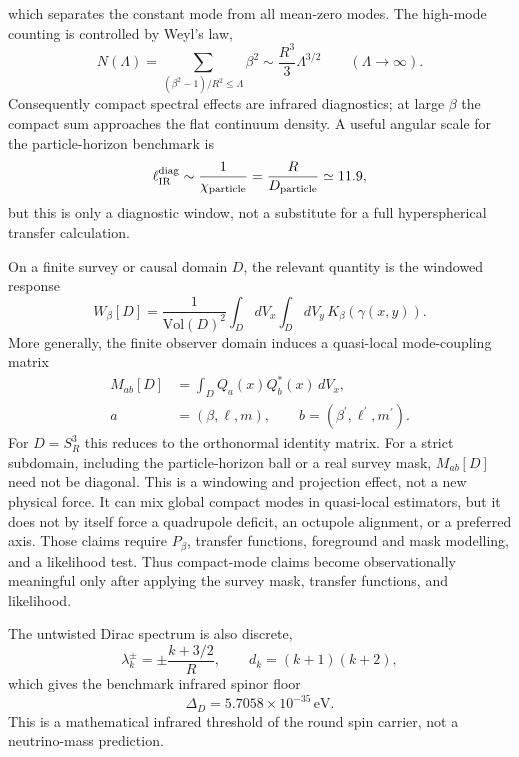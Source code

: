 \documentclass[aps,prd,onecolumn,superscriptaddress,longbibliography,nofootinbib,notitlepage]{revtex4-2}
\begin{document}
which separates the constant mode from all mean-zero modes. The high-mode counting is
controlled by Weyl's law,
\begin{equation}
  N(\Lambda)=\sum_{(\beta^2-1)/R^2\leq\Lambda}\beta^2
  \sim \frac{R^3}{3}\Lambda^{3/2}\qquad(\Lambda\to\infty).
\end{equation}
Consequently compact spectral effects are infrared diagnostics; at large $\beta$ the
compact sum approaches the flat continuum density. A useful angular scale for the
particle-horizon benchmark is
\begin{equation}
  \ell_{\rm IR}^{\rm diag}\sim\frac{1}{\chi_{\rm particle}}
  =\frac{R}{D_{\rm particle}}\simeq 11.9,
\end{equation}
but this is only a diagnostic window, not a substitute for a full hyperspherical
transfer calculation.

On a finite survey or causal domain $D$, the relevant quantity is the windowed response
\begin{equation}
  W_\beta[D]
  =\frac{1}{\mathrm{Vol}(D)^2}
  \int_DdV_x\int_DdV_y\,K_\beta(\gamma(x,y)).
\end{equation}
More generally, the finite observer domain induces a quasi-local mode-coupling matrix
\begin{equation}
\begin{aligned}
  M_{ab}[D]&=\int_D Q_a(x)Q_b^*(x)\,dV_x,\\
  a&=(\beta,\ell,m),\qquad b=(\beta^\prime,\ell^\prime,m^\prime).
\end{aligned}
\end{equation}
For $D=S^3_R$ this reduces to the orthonormal identity matrix. For a strict subdomain,
including the particle-horizon ball or a real survey mask, $M_{ab}[D]$ need not be
diagonal. This is a windowing and projection effect, not a new physical force. It can
mix global compact modes in quasi-local estimators, but it does not by itself force a
quadrupole deficit, an octupole alignment, or a preferred axis. Those claims require
$P_\beta$, transfer functions, foreground and mask modelling, and a likelihood test.
Thus compact-mode claims become observationally meaningful only after applying the
survey mask, transfer functions, and likelihood.

The untwisted Dirac spectrum is also discrete,
\begin{equation}
  \lambda_k^\pm=\pm\frac{k+3/2}{R},
  \qquad d_k=(k+1)(k+2),
\end{equation}
which gives the benchmark infrared spinor floor
\begin{equation}
  \Delta_D=5.7058\times10^{-35}\,\mathrm{eV}.
\end{equation}
This is a mathematical infrared threshold of the round spin carrier, not a neutrino-mass
prediction.
\end{document}
